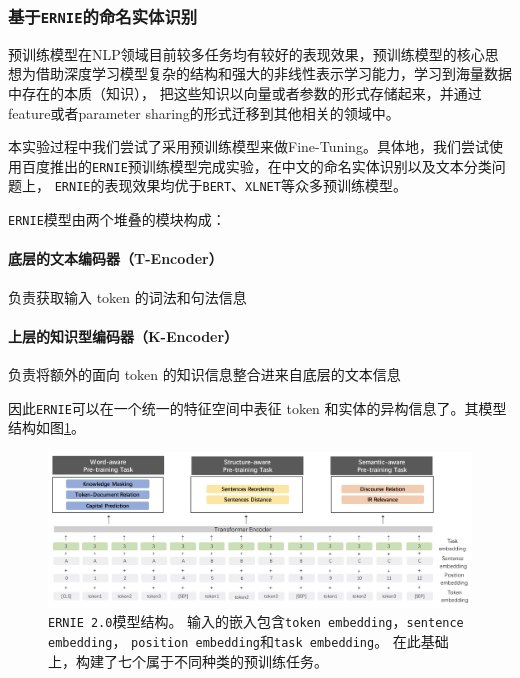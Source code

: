\documentclass[11pt,a4paper]{article}
\begin{document}
\subsubsection{基于\texttt{ERNIE}的命名实体识别}
预训练模型在NLP领域目前较多任务均有较好的表现效果，预训练模型的核心思想为借助深度学习模型复杂的结构和强大的非线性表示学习能力，学习到海量数据中存在的本质（知识），
把这些知识以向量或者参数的形式存储起来，并通过feature或者parameter sharing的形式迁移到其他相关的领域中。

本实验过程中我们尝试了采用预训练模型来做Fine-Tuning。具体地，我们尝试使用百度推出的\texttt{ERNIE}\cite{sun2019ernie}预训练模型完成实验，在中文的命名实体识别以及文本分类问题上，
\texttt{ERNIE}的表现效果均优于\texttt{BERT}、\texttt{XLNET}等众多预训练模型。

\texttt{ERNIE}模型由两个堆叠的模块构成：

\paragraph{底层的文本编码器（T-Encoder）} 负责获取输入 token 的词法和句法信息

\paragraph{上层的知识型编码器（K-Encoder）} 负责将额外的面向 token 的知识信息整合进来自底层的文本信息

因此\texttt{ERNIE}可以在一个统一的特征空间中表征 token 和实体的异构信息了。其模型结构如图\ref{fig:ernie}\cite{sun2019ernie}。

\begin{figure}[!h]
  \includegraphics[scale=0.34]{ernie}
  \caption{ \texttt{ERNIE 2.0}模型结构。 输入的嵌入包含\texttt{token embedding}，\texttt{sentence embedding}，
\texttt{position embedding}和\texttt{task embedding}。 在此基础上，构建了七个属于不同种类的预训练任务。}
  \label{fig:ernie}
\end{figure}
\end{document}
